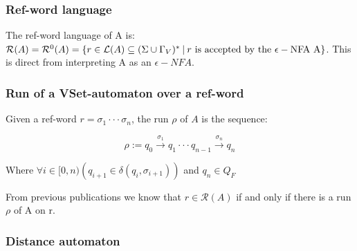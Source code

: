\documentclass{article}
\newcommand{\set}[1]{\left\{#1\right\}}
\newcommand{\paren}[1]{\left(#1\right)}
\newcommand{\st}{\ \vline \ }
\newcommand{\trans}[1]{\overset{#1}{\longrightarrow}}
\begin{document}



\subsubsection*{Ref-word language}
The ref-word language of A is: $\mathcal{R}(A) = \mathcal{R}^0(A)
= \set{r \in \mathcal{L}(A)\subseteq(\Sigma\cup\Gamma_V)^*\st
r\mathrm{\ is\ accepted\ by\ the\ \epsilon-NFA\ A}}$. This is direct
from interpreting A as an $\epsilon-NFA$.

\subsubsection*{Run of a VSet-automaton over a ref-word}

Given a ref-word $r = \sigma_1\cdot\cdot\cdot\sigma_n$, the run
$\rho$ of $A$ is the sequence:

\begin{equation}
    \rho:=q_0\trans{\sigma_1}q_1 \cdot\cdot\cdot q_{n-1}
    \trans{\sigma_n}q_n
\end{equation}

Where $\forall i \in [0,n)\paren{q_{i+1} \in \delta(q_i,\sigma_{i+1})}$
and $q_n\in Q_F$

From previous publications we know that $r \in \mathcal{R}(A)$ if
and only if there is a run $\rho$ of A on r.

\newpage
\subsubsection*{Distance automaton}
\end{document}
